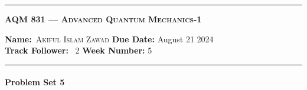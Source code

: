 \allowdisplaybreaks
\begin{center}
	\hrule
	\vspace{.4cm}
	\Large\scshape\textbf{AQM 831 --- Advanced Quantum Mechanics-1}
\end{center}
{\textbf{Name:}\ \textsc{Akiful Islam Zawad} \hspace{\hfill} \textbf{Due Date:} August 21 2024\\[5pt]
{ \textbf{Track Follower:}} \ 2 \hspace{\hfill} \textbf{Week Number:} 5 \\
	\hrule}
\paragraph*{Problem Set 5} %
\\
